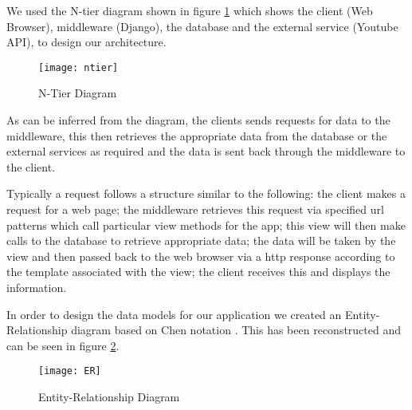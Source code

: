 We used the N-tier diagram shown in figure \ref{fig:n-tier} which
shows the client (Web Browser), middleware (Django), the database and
the external service (Youtube API), to design our architecture.

\begin{figure}[h]
  \begin{center}
    \texttt{[image: ntier]}
    \caption{N-Tier Diagram} \label{fig:n-tier}
  \end{center}
\end{figure}

As can be inferred from the diagram, the clients sends requests for
data to the middleware, this then retrieves the appropriate data from
the database or the external services as required and the data is sent
back through the middleware to the client.

Typically a request follows a structure similar to the following:
the client makes a request for a web page; the middleware retrieves
this request via specified url patterns which call particular view
methods for the app; this view will then make calls to the database to
retrieve appropriate data; the data will be taken by the view and then
passed back to the web browser via a http response according to the
template associated with the view; the client receives this and
displays the information.

In order to design the data models for our application we created an
Entity-Relationship diagram based on Chen notation
\cite{ChenNotation}.
This has been reconstructed and can be seen in figure \ref{fig:ER}.

\begin{figure}[h]
  \begin{center}
    \texttt{[image: ER]}
    \caption{Entity-Relationship Diagram} \label{fig:ER}
  \end{center}
\end{figure}

